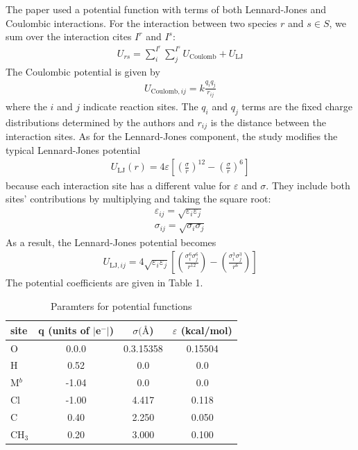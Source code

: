 \documentclass[12pt]{article}
\begin{document}
The paper used a potential function with terms of both Lennard-Jones and Coulombic interactions. For the interaction between two species $r$ and $s \in S$, we sum over the interaction cites $I^{r}$ and $I^{s}$:
\begin{gather*}
    U_{rs} = \sum_{i}^{I^{r}}\sum_{j}^{I^{s}} U_{\text{Coulomb}} + U_{\text{LJ}}
\end{gather*}
The Coulombic potential is given by 
\begin{gather*}
    U_{\text{Coulomb}, ij} = k \frac{q_{i}q_{j}}{r_{ij}}
\end{gather*}
where the $i$ and $j$ indicate reaction sites. The $q_{i}$ and $q_{j}$ terms are the fixed charge distributions determined by the authors and $r_{ij}$ is the distance between the interaction sites. As for the Lennard-Jones component, the study modifies the typical Lennard-Jones potential
\begin{gather*}
    U_{\text{LJ}}(r) = 4\varepsilon \left[ \left(\frac{\sigma}{r}\right)^{12} - \left(\frac{\sigma}{r}\right)^{6}\right]
\end{gather*}
because each interaction site has a different value for $\varepsilon$ and $\sigma$. They include both sites' contributions by multiplying and taking the square root:
\begin{gather*}
    \varepsilon_{ij} = \sqrt{\varepsilon_{i}\varepsilon_{j}}\\
    \sigma_{ij} = \sqrt{\sigma_{i}\sigma_{j}}
\end{gather*}
As a result, the Lennard-Jones potential becomes
\begin{gather*}
    U_{\text{LJ}, ij} = 4\sqrt{\varepsilon_{i}\varepsilon_{j}}\left[ \left(\frac{\sigma_{i}^{6}\sigma_{j}^{6}}{r^{12}}\right) - \left(\frac{\sigma_{i}^{3}\sigma_{j}^{3}}{r^{6}}\right)\right]
\end{gather*}
The potential coefficients are given in Table 1.

\begin{table}[h]
    \begin{center}
        \begin{tabular}{lccc}
            \toprule
            \textbf{site} & \textbf{q (units of $|$e$^{-}|$)} & \textbf{$\sigma (\text{\AA}$)} & $\varepsilon$ (kcal/mol)\\
            \midrule
            O & 0.0.0 & 0.3.15358 & 0.15504\\
H & 0.52 & 0.0 & 0.0 \\
M$^{b}$ & -1.04 & 0.0 & 0.0 \\
Cl & -1.00 & 4.417 & 0.118 \\
C & 0.40 & 2.250 & 0.050 \\
CH$_{3}$ & 0.20 & 3.000 & 0.100 \\

            \bottomrule 
            \end{tabular}
            \caption{Paramters for potential functions}
    \end{center}
\end{table}
\end{document}
